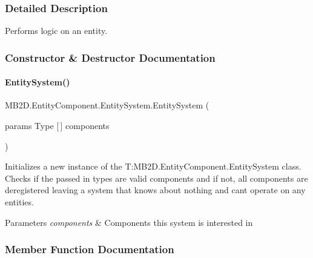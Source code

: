 \subsubsection{Detailed Description}
Performs logic on an entity. 



\subsubsection{Constructor \& Destructor Documentation}
\hypertarget{class_m_b2_d_1_1_entity_component_1_1_entity_system_abc7175246313b23db881d09da586428a}{}\label{class_m_b2_d_1_1_entity_component_1_1_entity_system_abc7175246313b23db881d09da586428a} 
\paragraph{\texorpdfstring{Entity\+System()}{EntitySystem()}}
{\footnotesize\ttfamily M\+B2\+D.\+Entity\+Component.\+Entity\+System.\+Entity\+System (\begin{DoxyParamCaption}\item[{params Type \mbox{[}$\,$\mbox{]}}]{components }\end{DoxyParamCaption})\hspace{0.3cm}{\ttfamily [inline]}}



Initializes a new instance of the T\+:\+M\+B2\+D.\+Entity\+Component.\+Entity\+System class. Checks if the passed in types are valid components and if not, all components are deregistered leaving a system that knows about nothing and can\textquotesingle{}t operate on any entities. 


\begin{DoxyParams}{Parameters}
{\em components} & Components this system is interested in\\
\hline
\end{DoxyParams}


\subsubsection{Member Function Documentation}
\hypertarget{class_m_b2_d_1_1_entity_component_1_1_entity_system_aaf18ceb985015ddbff4a361a3b1de5bb}{}\label{class_m_b2_d_1_1_entity_component_1_1_entity_system_aaf18ceb985015ddbff4a361a3b1de5bb} 

